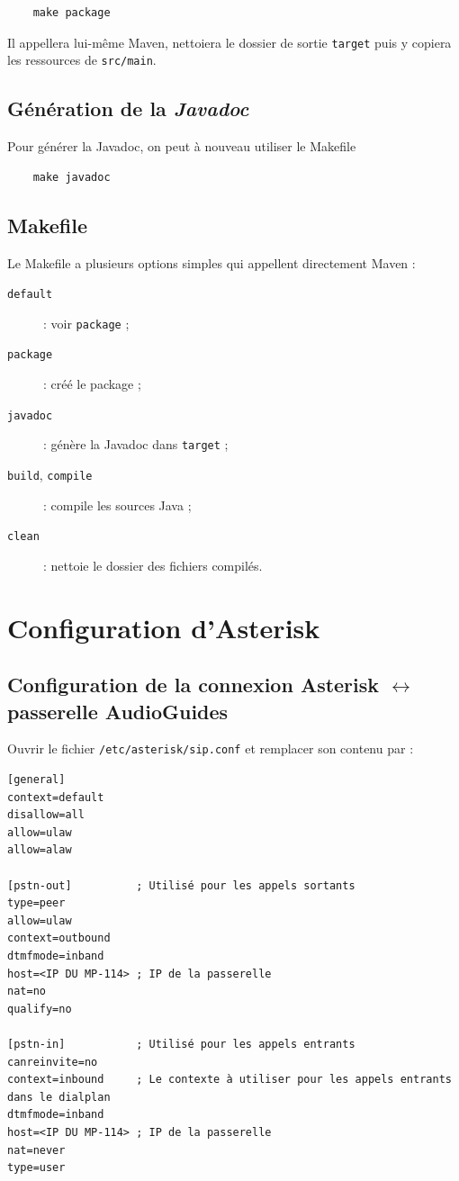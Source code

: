 \documentclass{article}
\begin{document}
\begin{verbatim}
    make package
\end{verbatim}

Il appellera lui-même Maven, nettoiera le dossier de sortie \texttt{target} puis y copiera les ressources de \texttt{src/main}.

\subsection{Génération de la \emph{Javadoc}}

Pour générer la Javadoc, on peut à nouveau utiliser le Makefile

\begin{verbatim}
    make javadoc
\end{verbatim}

\subsection{Makefile}

Le Makefile a plusieurs options simples qui appellent directement Maven :

\begin{description}
    \item[\texttt{default}] : voir \texttt{package} ;
    \item[\texttt{package}] : créé le package ;
    \item[\texttt{javadoc}] : génère la Javadoc dans \texttt{target} ;
    \item[\texttt{build}, \texttt{compile}] : compile les sources Java ;
    \item[\texttt{clean}] : nettoie le dossier des fichiers compilés.
\end{description}

\pagebreak
\section{Configuration d'Asterisk}

\subsection{Configuration de la connexion Asterisk \texorpdfstring{$\longleftrightarrow$}{ - } passerelle AudioGuides}

Ouvrir le fichier \texttt{/etc/asterisk/sip.conf} et remplacer son contenu par :

\begin{verbatim}
[general]
context=default
disallow=all
allow=ulaw
allow=alaw

[pstn-out]          ; Utilisé pour les appels sortants
type=peer 
allow=ulaw
context=outbound 
dtmfmode=inband
host=<IP DU MP-114> ; IP de la passerelle
nat=no
qualify=no

[pstn-in]           ; Utilisé pour les appels entrants
canreinvite=no
context=inbound     ; Le contexte à utiliser pour les appels entrants dans le dialplan
dtmfmode=inband
host=<IP DU MP-114> ; IP de la passerelle
nat=never
type=user
\end{verbatim}
\end{document}
